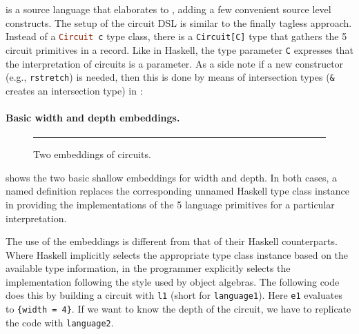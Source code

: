 \sedel is a source language that elaborates to \fnamee, adding
a few convenient source level constructs.
The \sedel setup of the circuit DSL is similar to the finally tagless
approach. Instead of a \lstinline[language=haskell]{Circuit c} type class, there is a \lstinline{Circuit[C]}
type that gathers the 5 circuit primitives in a record. Like in Haskell, the type
parameter \lstinline{C} expresses that the interpretation of circuits
is a parameter.
As a side note if a new constructor (e.g., \lstinline{rstretch}) is
needed, then this is done by means of
intersection types (\lstinline{&} creates an intersection type) in \sedel:

\paragraph{Basic width and depth embeddings.}

\begin{figure}[t]
\hrule
\caption{Two \sedel embeddings of circuits.}
\label{fig:sedel}
\end{figure}

 shows the two basic shallow embeddings for width and
depth. In both cases, a named \sedel definition
replaces the corresponding unnamed
Haskell type class instance in providing the implementations of the 5 language
primitives for a particular interpretation.


The use of the \sedel embeddings is different from that of their Haskell
counterparts. Where Haskell implicitly selects the appropriate type class
instance based on the available type information, in \sedel the programmer
explicitly selects the implementation following the style used by
object algebras.
The following code does this by
building a circuit with \lstinline{l1} (short for \lstinline{language1}).
Here \lstinline{e1} evaluates to \lstinline${width = 4}$. If we want to know the
depth of the circuit, we have to replicate the code with \lstinline{language2}.

